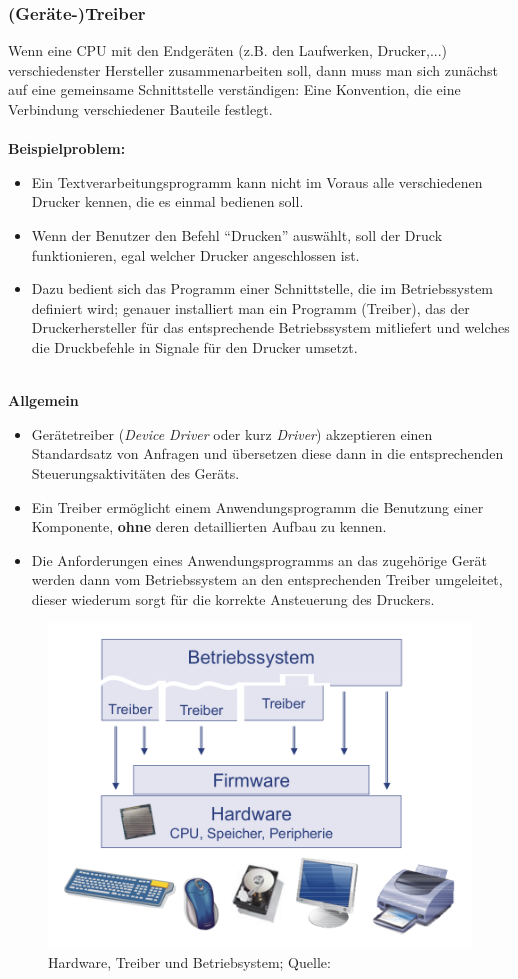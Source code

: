 \subsubsection{(Geräte-)Treiber}
Wenn eine CPU mit den Endgeräten (z.B. den Laufwerken, Drucker,...) verschiedenster Hersteller zusammenarbeiten soll, dann muss man sich zunächst auf eine gemeinsame Schnittstelle verständigen: Eine Konvention, die eine Verbindung verschiedener Bauteile festlegt.\\
~\\
\textbf{Beispielproblem:}
\begin{itemize}
	\item Ein Textverarbeitungsprogramm kann nicht im Voraus alle verschiedenen Drucker kennen, die
es  einmal bedienen soll.
\item Wenn der Benutzer den Befehl ``Drucken'' auswählt, soll der Druck funktionieren, egal welcher Drucker angeschlossen ist.
\item Dazu bedient sich das Programm einer Schnittstelle, die im Betriebssystem definiert wird; genauer installiert man ein Programm (Treiber), das der Druckerhersteller für das entsprechende Betriebssystem mitliefert und welches die Druckbefehle in Signale für den Drucker umsetzt.
\end{itemize}
~\\
\textbf{Allgemein}
\begin{itemize}
	\item  Gerätetreiber (\textit{Device Driver }oder kurz \textit{Driver}) akzeptieren einen Standardsatz von Anfragen und übersetzen diese dann in die entsprechenden Steuerungsaktivitäten des Geräts.
\item Ein Treiber ermöglicht einem Anwendungsprogramm die Benutzung einer
Komponente, \textbf{ohne} deren detaillierten Aufbau zu kennen.
\item Die Anforderungen eines
Anwendungsprogramms an das zugehörige Gerät werden dann vom Betriebssystem an den entsprechenden Treiber umgeleitet, dieser wiederum sorgt für die korrekte Ansteuerung des
Druckers.
\end{itemize}
%
\begin{figure}[h!]
	\centering
	\includegraphics[width=0.5\linewidth]{./media/treiber}
	\caption[Treiber]{Hardware, Treiber und Betriebsystem; Quelle: \cite[Abb. 1.27]{gumm1}}
	\label{fig:treiber}
\end{figure}

